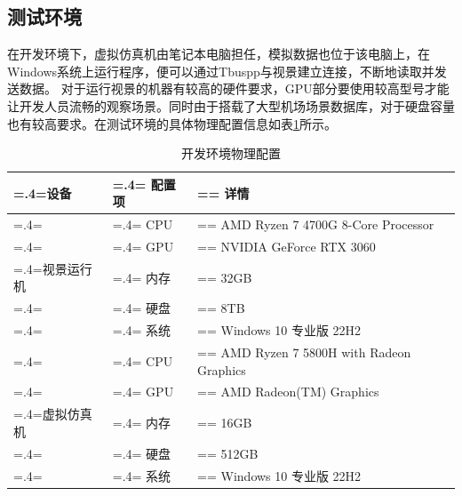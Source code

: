 \subsection{测试环境}
在开发环境下，虚拟仿真机由笔记本电脑担任，模拟数据也位于该电脑上，在Windows系统上运行程序，便可以通过Tbuspp与视景建立连接，不断地读取并发送数据。
对于运行视景的机器有较高的硬件要求，GPU部分要使用较高型号才能让开发人员流畅的观察场景。同时由于搭载了大型机场场景数据库，对于硬盘容量也有较高要求。在测试环境的具体物理配置信息如表\ref{devhard}所示。
\begin{table}[h!]
    \begin{center}
        \caption{开发环境物理配置}
        \renewcommand\arraystretch{1.5}
        \label{devhard}
        \begin{tabularx}{\textwidth}{ 
             >{\centering\arraybackslash\hsize=.4\hsize\linewidth=\hsize}X 
             >{\centering\arraybackslash\hsize=.4\hsize\linewidth=\hsize}X 
             >{\centering\arraybackslash\hsize=\hsize\linewidth=\hsize}X 
             }
             \hline
            \textbf{设备} & \textbf{配置项} & \textbf{详情}\\
             \hline
             & CPU & AMD Ryzen 7 4700G 8-Core Processor\\
           
             & GPU & NVIDIA GeForce RTX 3060\\
             
             视景运行机 & 内存 & 32GB\\
            
             & 硬盘 & 8TB\\
             
             & 系统 & Windows 10 专业版 22H2\\
             \hline
             & CPU & AMD Ryzen 7 5800H with Radeon Graphics\\
           
             & GPU & AMD Radeon(TM) Graphics\\
             
             虚拟仿真机 & 内存 & 16GB\\
            
             & 硬盘 & 512GB\\
             
             & 系统 & Windows 10 专业版 22H2\\
             \hline
            \end{tabularx}
    \end{center}
\end{table}
\par

